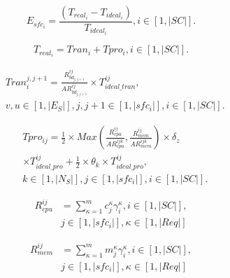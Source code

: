 \documentclass{ieeeaccess}
\begin{document}
\begin{equation}E_{sfc_{i}}=\frac{\left ( T_{real_{i}} - T_{ideal_{i}} \right )}{T_{ideal_{i}}},i \in \left [ 1,|SC| \right ].\label{eq1}
\end{equation}

\begin{equation}
T_{real_{i}}  =Tran_{i}+Tpro_{i},i \in \left [ 1,|SC| \right ].
\end{equation}

\begin{equation}
\begin{aligned}
&Tran_{i}^{j,j+1}=\frac{R_{bd_{j,j+1}}^{ij}}{AR_{bd_{j,j+1}}^{ij}}\times T_{ideal\_tran}^{ij},\\
&v,u \in \left [ 1,|E_{S}| \right ],j,j+1 \in \left [ 1,|sfc_{i}| \right ],i \in \left [ 1,|SC| \right ].\label{eq}
\end{aligned}
\end{equation}

\begin{equation}
\begin{aligned}
&Tpro_{ij}=\frac{1}{2} \times Max\left ( \frac{R_{cpu}^{ij}}{AR_{cpu}^{ijk}},\frac{R_{mem}^{ij}}{AR_{mem}^{ijk}} \right )\times \delta _{z} \\
& \times T_{ideal\_pro}^{ij} + \frac{1}{2} \times \theta _{k} \times T_{ideal\_pro}^{ij},\\
& k \in \left [ 1,|N_{S}| \right ],j \in  \left [ 1,|sfc_{i}| \right ],i \in \left [ 1,|SC| \right ].
\end{aligned}
\end{equation}

\begin{equation}
  \begin{aligned}
    R_{cpu}^{ij}&= \sum_{\kappa=1}^{m}c_{j}^{\kappa} \gamma_{i}^{\kappa}, i \in \left [ 1,|SC| \right ],\\
    &j \in \left [ 1,|sfc_{i}| \right ],\kappa \in \left [ 1,|Req| \right ]
  \end{aligned}
\end{equation}

\begin{equation}
  \begin{aligned}
    R_{mem}^{ij}&= \sum_{\kappa=1}^{m}m_{j}^{\kappa} \gamma_{i}^{\kappa}, i \in \left [ 1,|SC| \right ],\\
    &j \in \left [ 1,|sfc_{i}| \right ],\kappa \in \left [ 1,|Req| \right ]
  \end{aligned}
\end{equation}
\end{document}
